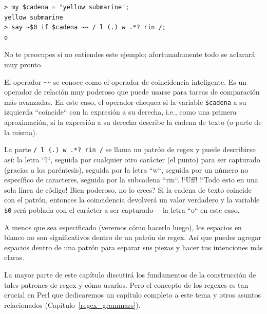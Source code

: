 \begin{lstlisting}
> my $cadena = "yellow submarine";
yellow submarine
> say ~$0 if $cadena ~~ / l (.) w .*? rin /;
o
\end{lstlisting}

No te preocupes si no entiendes este ejemplo;
afortunadamente todo se aclarará muy pronto.

El operador \verb|~~| se conoce como el operador de coincidencia
inteligente. Es un operador de relación muy poderoso que puede
usarse para tareas de comparación más avanzadas. En este caso, 
el operador chequea si la variable {\tt \$cadena} a su izquierda
``coincide`` con la expresión a su derecha, i.e., como una 
primera aproximación, si la expresión a su derecha describe la 
cadena de texto (o parte de la misma).

La parte \verb|/ l (.) w .*? rin /| se llama un patrón de regex y puede
describirse así: la letra ``l``, seguida por cualquier otro carácter (el
punto) para ser capturado (gracias a los paréntesis), seguida por la
letra ``w``, seguida por un número no específico de caracteres,
seguida por la subcadena ``rin``. !`Uff! !`Todo esto en una sola línea
de código! Bien poderoso, no lo crees? Si la cadena de texto coincide 
con el patrón, entonces la coincidencia devolverá un valor verdadero y 
la variable \verb|$0| será poblada con el carácter a ser capturado---
la letra ``o`` en este caso.

A menos que sea especificado (veremos cómo hacerlo luego),
los espacios en blanco no son significativos dentro de un 
patrón de regex. Así que puedes agregar espacios dentro de una patrón
para separar sus piezas y hacer tus intenciones más claras.

La mayor parte de este capítulo discutirá los fundamentos de 
la construcción de tales patrones de regex y cómo usarlos. 
Pero el concepto de los regexes es tan crucial en Perl que 
dedicaremos un capítulo completo a este tema y otros asuntos
relacionados (Capítulo~\ref{regex_grammars}).

